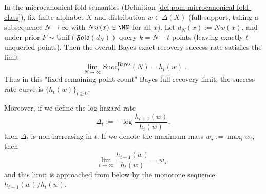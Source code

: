 \begin{corollary}\label{cor:pom-bayes-full-recovery-hazard-monotone}
In the microcanonical fold semantics (Definition \ref{def:pom-microcanonical-fold-class}),
fix finite alphabet \(X\) and distribution \(w\in\Delta(X)\) (full support, taking a subsequence \(N\to\infty\) with \(Nw(x)\in\NN\) for all \(x\)).
Let \(d_N(x):=Nw(x)\), and under prior \(F\sim\mathrm{Unif}(\mathfrak{Fold}(d_N))\) query \(k=N-t\) points (leaving exactly \(t\) unqueried points).
Then the overall Bayes exact recovery success rate satisfies the limit
\[
\boxed{\;
\lim_{N\to\infty}\mathrm{Succ}^{\mathrm{Bayes}}_t(N)=h_t(w)\; }.
\]
Thus in this "fixed remaining point count" Bayes full recovery limit, the success rate curve is \(\{h_t(w)\}_{t\ge0}\).
\par
Moreover, if we define the log-hazard rate
\[
\Delta_t:=-\log\frac{h_{t+1}(w)}{h_t(w)},
\]
then \(\Delta_t\) is non-increasing in \(t\).
If we denote the maximum mass \(w_\star:=\max_i w_i\), then
\[
\lim_{t\to\infty}\frac{h_{t+1}(w)}{h_t(w)}=w_\star,
\]
and this limit is approached from below by the monotone sequence \(h_{t+1}(w)/h_t(w)\).
\end{corollary}
